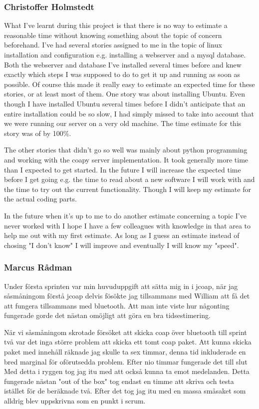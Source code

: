 \subsubsection{Christoffer Holmstedt}
What I've learnt during this project is that there is no way to estimate a reasonable time without knowing something about the topic of concern beforehand.
I've had several stories assigned to me in the topic of linux installation and configuration e.g. installing a webserver and a mysql database.
Both the webserver and database I've installed several times before and knew exactly which steps I was supposed to do to get it up and running as soon as possible.
Of course this made it really easy to estimate an expected time for these stories, or at least most of them.
One story was about installing Ubuntu.
Even though I have installed Ubuntu several times before I didn't anticipate that an entire installation could be so slow, I had simply missed to take into account that we were running our server on a very old machine.
The time estimate for this story was of by 100\%.

The other stories that didn't go so well was mainly about python programming and working with the coapy server implementation. 
It took generally more time than I expected to get started.
In the future I will increase the expected time before I get going e.g. the time to read about a new software I will work with and the time to try out the current functionality.
Though I will keep my estimate for the actual coding parts.

In the future when it's up to me to do another estimate concerning a topic I've never worked with I hope I have a few colleagues with knowledge in that area to help me out with my first estimate.
As long as I guess an estimate instead of chosing "I don't know" I will improve and eventually I will know my "speed".

\subsubsection{Marcus Rådman}
Under första sprinten var min huvuduppgift att sätta mig in i jcoap, när jag såsmåningom förstå jcoap delvis fösökte jag tillsammans med William att få det att fungera tillsammans med bluetooth.
Att man inte viste hur någonting fungerade gorde det nästan omöjligt att göra en bra tidsestimering. 

När vi såsmåningom skrotade försöket att skicka coap över bluetooth till sprint två var det inga större problem att skicka ett tomt coap paket.
Att kunna skicka paket med innehåll räknade jag skulle ta sex timmar, denna tid inkluderade en bred marginal för oförutsedda problem. Efter nio timmar fungerade det till slut
Med detta i ryggen tog jag itu med att också kunna ta emot medelanden. Detta fungerade nästan "out of the box" tog endast en timme att skriva och testa istället för de beräknade två.
Efter det tog jag itu med en massa småsaket som alldrig blev uppskrivna som en punkt i scrum.

